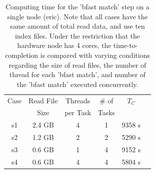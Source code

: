 \documentclass{cpeauth}
\begin{document}



 \begin{table}
 \small
 \begin{tabular}{|c|c|c|c|c|c|} 
 \hline 
Case & Read File  & Threads & \# of   & $T_C$ \\
& Size &  per Task &  Tasks &   \\  \hline
s1 & 2.4 GB &  4 & 1 & 9358 s \\
s2 & 1.2 GB & 2 & 2 & 5290 s \\
s3 & 0.6 GB & 1 & 4 & 9152 s \\ 
s4& 0.6 GB & 4 & 4 & 5804 s \\

 \hline
 \end{tabular}
 
 \caption{Computing time for the 'bfast match' step on a single node
   (eric). Note that all cases have the same amount of total read
   data, and use ten index files.  Under the restriction that the
   hardware node has 4 cores, the time-to-completion is compared with
   varying conditions regarding the size of read files, the number of
   thread for each 'bfast match', and number of the 'bfast match'
   executed concurrently.  }
    \label{table:understandio}
\end{table}







\end{document}
